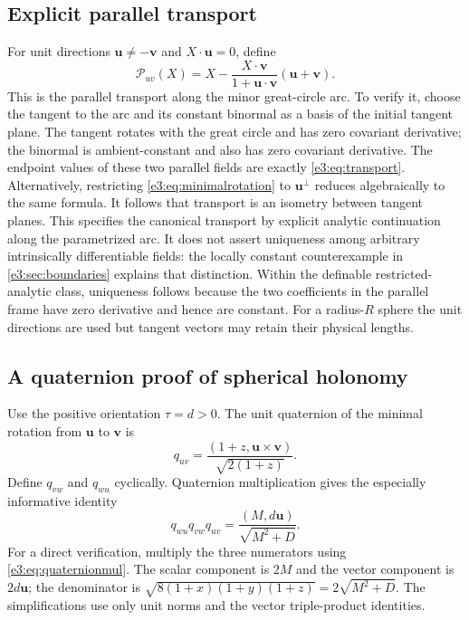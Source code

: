 \documentclass[11pt,letterpaper]{article}
\numberwithin{equation}{section}
\theoremstyle{definition}
\theoremstyle{remark}
\newcommand{\vv}[1]{\bm{#1}}
\begin{document}
\subsection{Explicit parallel transport}

For unit directions $\vv u\ne-\vv v$ and $X\cdot\vv u=0$, define
\begin{equation}\label{e3:eq:transport}
 \mathcal P_{uv}(X)=X-
       \frac{X\cdot\vv v}{1+\vv u\cdot\vv v}(\vv u+\vv v).
\end{equation}
This is the parallel transport along the minor great-circle arc. To verify
it, choose the tangent to the arc and its constant binormal as a basis of the
initial tangent plane. The tangent rotates with the great circle and has
zero covariant derivative; the binormal is ambient-constant and also has
zero covariant derivative. The endpoint values of these two parallel fields
are exactly \cref{e3:eq:transport}. Alternatively, restricting
\cref{e3:eq:minimalrotation} to $\vv u^\perp$ reduces algebraically to the
same formula. It follows that transport is an isometry between tangent planes.
This specifies the canonical transport by explicit analytic continuation
along the parametrized arc. It does not assert uniqueness among arbitrary
intrinsically differentiable fields: the locally constant counterexample in
\cref{e3:sec:boundaries} explains that distinction. Within the definable
restricted-analytic class, uniqueness follows because the two coefficients
in the parallel frame have zero derivative and hence are constant.
For a radius-$R$ sphere the unit directions are used but tangent vectors may
retain their physical lengths.

\subsection{A quaternion proof of spherical holonomy}

Use the positive orientation $\tau=d>0$. The unit quaternion of the minimal
rotation from $\vv u$ to $\vv v$ is
\begin{equation}\label{e3:eq:edgequaternion}
 q_{uv}=\frac{(1+z,\vv u\times\vv v)}{\sqrt{2(1+z)}}.
\end{equation}
Define $q_{vw}$ and $q_{wu}$ cyclically. Quaternion multiplication gives the
especially informative identity
\begin{equation}\label{e3:eq:holonomyquat}
 q_{wu}q_{vw}q_{uv}=
       \frac{(M,d\vv u)}{\sqrt{M^2+D}}.
\end{equation}
For a direct verification, multiply the three numerators using
\cref{e3:eq:quaternionmul}. The scalar component is $2M$ and the vector
component is $2d\vv u$; the denominator is
$\sqrt{8(1+x)(1+y)(1+z)}=2\sqrt{M^2+D}$.
The simplifications use only unit norms and the vector triple-product
identities.
\end{document}
